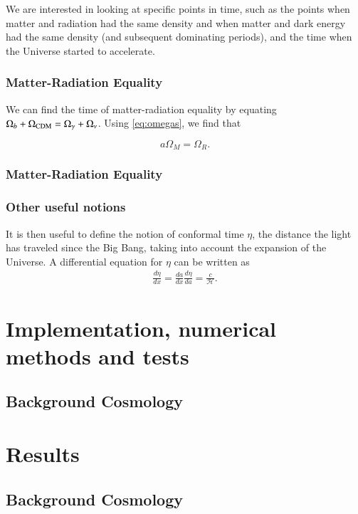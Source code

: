 \documentclass{aa}
\begin{document}
We are interested in looking at specific points in time, such as the points when matter and radiation had the same density and when matter and dark energy had the same density (and subsequent dominating periods), and the time when the Universe started to accelerate.

\subsubsection{Matter-Radiation Equality}

We can find the time of matter-radiation equality by equating $
\Omega_b + \Omega_{\rm CDM} = \Omega_\gamma + \Omega_{\nu}$. Using \eqref{eq:omegas}, we find that

\begin{equation}
    a\Omega_M = \Omega_R.
\end{equation}

\subsubsection{Matter-Radiation Equality}

\subsubsection{Other useful notions}

It is then useful to define the notion of conformal time $\eta$, the distance the light has traveled since the Big Bang, taking into account the expansion of the Universe. A differential equation for $\eta$ can be written as
\begin{align}
\frac{d\eta}{dx} = \frac{da}{dx}\frac{d\eta}{da} = \frac{c}{\mathcal{H}}.
\end{align}


\section{Implementation, numerical methods and tests}

\subsection{Background Cosmology}

\section{Results}

\subsection{Background Cosmology}
\end{document}
